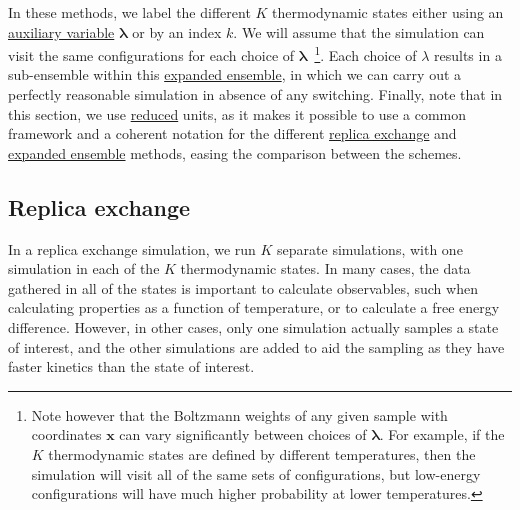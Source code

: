 \documentclass[9pt,review]{livecoms}
\newcommand{\vx}{\mathbf{x}}
\begin{document}
In these methods, we label the different $K$ thermodynamic states either using an \hyperlink{ref:AuxVar} {auxiliary variable} $\mathbf{\lambda}$  or by an index $k$. We will assume that the simulation can visit the same configurations for each choice of $\mathbf{\lambda}$~\footnote{Note however that the Boltzmann weights of any given sample with coordinates $\vx$ can vary significantly between choices of $\mathbf{\lambda}$. For example, if the $K$ thermodynamic states are defined by different temperatures, then the simulation will visit all of the same sets of configurations, but low-energy configurations will have much higher probability at lower temperatures.}. Each choice of $\lambda$ results in a sub-ensemble within this \hyperlink{ref:ExpEns} {expanded ensemble}, in which we can carry out a perfectly reasonable simulation in absence of any switching. Finally, note that in this section, we use \hyperlink{ref:reduced} {reduced} units, as it makes it possible to use a common framework and a coherent notation for the different \hyperlink{ref:ReplEx} {replica exchange} and \hyperlink{ref:ExpEns} {expanded ensemble} methods, easing the comparison between the schemes.

\subsection{Replica exchange}
\label{sec:ReplicaExchange}
In a replica exchange simulation, we run $K$ separate simulations, with one simulation in each of the $K$ thermodynamic states. In many cases, the data gathered in all of the states is important to calculate observables, such when calculating properties as a function of temperature, or to calculate a free energy difference. However, in other cases, only one simulation actually samples a state of interest, and the other simulations are added to aid the sampling as they have faster kinetics than the state of interest.
\end{document}
